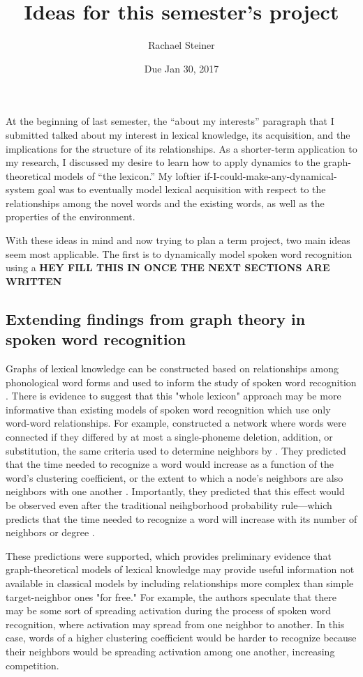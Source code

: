 \documentclass{article}
\title{Ideas for this semester's project}
\date{Due Jan 30, 2017}
\author{Rachael Steiner}
\begin{document}
\maketitle

At the beginning of last semester, the ``about my interests'' paragraph
that I submitted talked about my interest in lexical knowledge, its
acquisition, and the implications for the structure of its
relationships. As a shorter-term application to my research, I discussed
my desire to learn how to apply dynamics to the graph-theoretical models
of ``the lexicon.'' My loftier if-I-could-make-any-dynamical-system goal
was to eventually model lexical acquisition with respect to the
relationships among the novel words and the existing words, as well as
the properties of the environment.

With these ideas in mind and now trying to plan a term project, two main
ideas seem most applicable. The first is to dynamically model spoken
word recognition using a \textbf{HEY FILL THIS IN ONCE THE NEXT SECTIONS
ARE WRITTEN}

\subsection{Extending findings from graph theory in spoken word
recognition}\label{extending-findings-from-graph-theory-in-spoken-word-recognition}

Graphs of lexical knowledge can be constructed based on relationships among
phonological word forms and used to inform the study of spoken word recognition
\citep{vit08}. There is evidence to suggest that this "whole lexicon" approach
may be more informative than existing models of spoken word recognition which
use only word-word relationships. For example, \citet{ChVit09} constructed a
network where words were connected if they differed by at most a single-phoneme
deletion, addition, or substitution, the same criteria used to determine neighbors
by \citet{lp98}. They predicted that the time needed to recognize a word would
increase as a function of the word's clustering coefficient, or the extent to
which a node's neighbors are also neighbors with one another \citep{ws}.
Importantly, they predicted that this effect would be observed even after the
traditional neihgborhood probability rule---which predicts that the time needed
to recognize a word will increase with its number of neighbors or degree \citep{lp98}.

These predictions were supported, which provides preliminary evidence that
graph-theoretical models of lexical knowledge may provide useful information not available
in classical models by including relationships more complex than simple target-neighbor
ones "for free." For example, the authors speculate that there may be some sort
of spreading activation during the process of spoken word recognition, where activation
may spread from one neighbor to another. In this case, words of a higher clustering
coefficient would be harder to recognize because their neighbors would be spreading
activation among one another, increasing competition.
\end{document}
